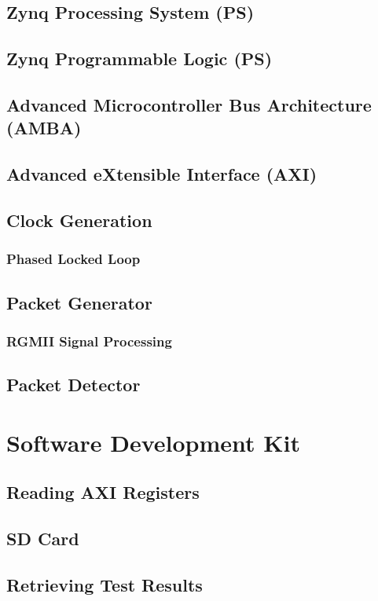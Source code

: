 \subsection{Zynq Processing System (PS)}
\subsection{Zynq Programmable Logic (PS)}
\subsection{Advanced Microcontroller Bus Architecture (AMBA)}
\subsection{Advanced eXtensible Interface (AXI)}
\subsection{Clock Generation}
\subsubsection{Phased Locked Loop}
\subsection{Packet Generator}
\subsubsection{RGMII Signal Processing}
\subsection{Packet Detector}
\section{Software Development Kit}
\subsection{Reading AXI Registers}
\subsection{SD Card}
\subsection{Retrieving Test Results}

